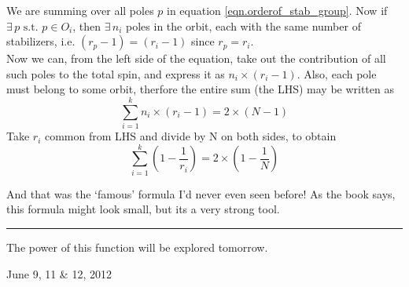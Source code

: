We are summing over all poles $p$ in equation \ref{eqn.orderof_stab_group}. Now if $\exists\,p \text{   s.t. } p \in O_{i}$, then $\exists\,n_{i}$ poles in the orbit, each with the same number of stabilizers, i.e. $(r_{p} - 1) = (r_{i} -1)$ since $r_{p}=r_{i}$.\\ 
Now we can, from the left side of the equation, take out the contribution of all such poles to the total spin, and express it as $n_{i} \times (r_{i}-1)$. Also, each pole must belong to some orbit, therfore the entire sum (the LHS) may be written as
\begin{equation}
\sum\limits_{i=1}^{k} n_{i} \times (r_{i}-1) = 2 \times (N - 1)
\label{eqn.D}
\end{equation}
Take $r_{i}$ common from LHS and divide by N on both sides, to obtain
\begin{equation}
\sum\limits_{i=1}^{k} (1 - \frac{1}{r_{i}}) = 2 \times (1 - \frac{1}{N})
\label{eqn.E}
\end{equation}
\par
And that was the `famous' formula I'd never even seen before! As the book says, this formula might look small, but its a very strong tool.\\
\hrule
\par
The power of this function will be explored tomorrow.
\par



\begin{flushright} {\small June 9, 11 \& 12, 2012} \end{flushright}

